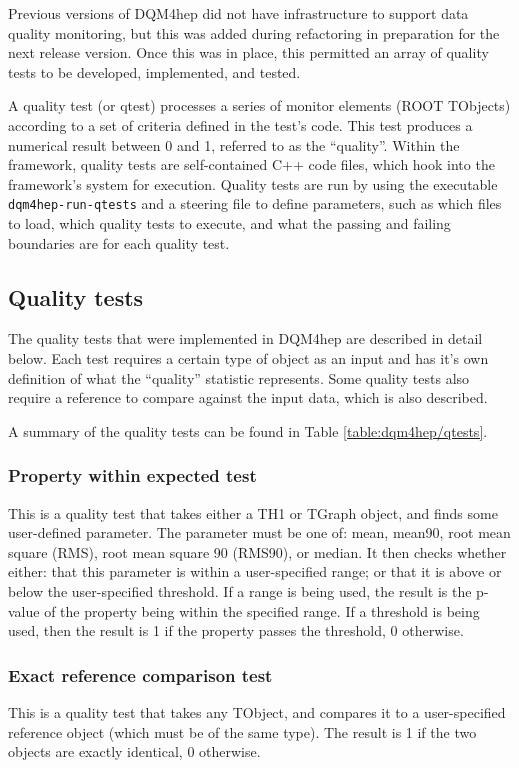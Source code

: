 Previous versions of \acrshort{DQM4hep} did not have infrastructure to support data quality monitoring, but this was added during refactoring in preparation for the next release version. Once this was in place, this permitted an array of quality tests to be developed, implemented, and tested. 

A quality test (or \acrshort{qtest}) processes a series of monitor elements (ROOT TObjects) according to a set of criteria defined in the test's code. This test produces a numerical result between 0 and 1, referred to as the ``quality''. Within the framework, quality tests are self-contained C++ code files, which hook into the framework's system for execution. Quality tests are run by using the executable \texttt{dqm4hep-run-qtests} and a steering file to define parameters, such as which files to load, which quality tests to execute, and what the passing and failing boundaries are for each quality test. 

\subsection{Quality tests}
The quality tests that were implemented in \acrshort{DQM4hep} are described in detail below. Each test requires a certain type of object as an input and has it's own definition of what the ``quality'' statistic represents. Some quality tests also require a reference to compare against the input data, which is also described.

A summary of the quality tests can be found in Table \ref{table:dqm4hep/qtests}.

\subsubsection{Property within expected test}
\label{sec:property-qtest}
This is a quality test that takes either a TH1 or TGraph object, and finds some user-defined parameter. The parameter must be one of: mean, mean90, root mean square (RMS), root mean square 90 (RMS90), or median. It then checks whether either: that this parameter is within a user-specified range; or that it is above or below the user-specified threshold. If a range is being used, the result is the p-value of the property being within the specified range. If a threshold is being used, then the result is 1 if the property passes the threshold, 0 otherwise.

\subsubsection{Exact reference comparison test}
This is a quality test that takes any TObject, and compares it to a user-specified reference object (which must be of the same type). The result is 1 if the two objects are exactly identical, 0 otherwise. 

